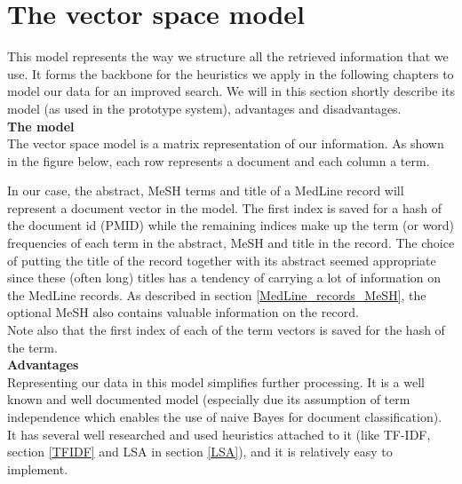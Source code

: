 
\section{The vector space model\label{VectorSpace}}

This model represents the way we structure all the retrieved
information that we use. It forms the backbone for the heuristics we
apply in the following chapters to model our data for an improved
search. We will in this section shortly describe its model (as used in
the prototype system), advantages and disadvantages.\\

\textbf{The model} \\
The vector space model is a matrix representation of our
information. As shown in the figure below, each row represents a
document and each column a term.\\


In our case, the abstract, MeSH terms and title of a MedLine record
will represent a document vector in the model. The first index is
saved for a hash of the document id (PMID) while the remaining indices
make up the term (or word) frequencies of each term in the abstract,
MeSH and title in the record. The choice of putting the title of the
record together with its abstract seemed appropriate since these
(often long) titles has a tendency of carrying a lot of information on
the MedLine records. As described in section \ref{MedLine_records_MeSH}, the
optional MeSH also contains valuable information on the record.\\

Note also that the first index of each of the term vectors is saved
for the hash of the term.\\

\textbf{Advantages} \\ 
Representing our data in this model simplifies further
processing. It is a well known and well documented model (especially
due its assumption of term independence which enables the use of naive
Bayes for document classification). It has several well researched and
used heuristics attached to it (like TF-IDF, section \ref{TFIDF} and LSA
 in section \ref{LSA}), and it is relatively easy to implement.\\

